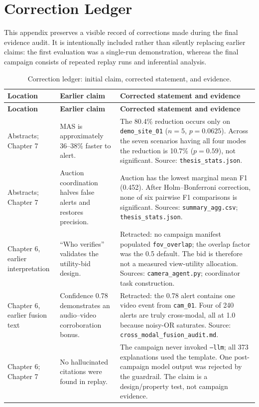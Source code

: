 \chapter{Correction Ledger}
\label{app:corrections}

This appendix preserves a visible record of corrections made during the final
evidence audit. It is intentionally included rather than silently replacing
earlier claims: the first evaluation was a single-run demonstration, whereas
the final campaign consists of repeated replay runs and inferential analysis.

\small
\begin{longtable}{p{2.7cm}p{3.4cm}p{4.7cm}}
\caption{Correction ledger: initial claim, corrected statement, and evidence.}\label{tab:correction-ledger}\\
\toprule
\textbf{Location} & \textbf{Earlier claim} & \textbf{Corrected statement and evidence} \\
\midrule
\endfirsthead
\toprule
\textbf{Location} & \textbf{Earlier claim} & \textbf{Corrected statement and evidence} \\
\midrule
\endhead
Abstracts; Chapter 7 & MAS is approximately 36--38\% faster to alert. & The 80.4\% reduction occurs only on \texttt{demo\_site\_01} ($n=5$, $p=0.0625$). Across the seven scenarios having all four modes the reduction is 10.7\% ($p=0.59$), not significant. Source: \texttt{thesis\_stats.json}. \\
Abstracts; Chapter 7 & Auction coordination halves false alerts and restores precision. & Auction has the lowest marginal mean F1 (0.452). After Holm--Bonferroni correction, none of six pairwise F1 comparisons is significant. Sources: \texttt{summary\_agg.csv}; \texttt{thesis\_stats.json}. \\
Chapter 6, earlier interpretation & ``Who verifies'' validates the utility-bid design. & Retracted: no campaign manifest populated \texttt{fov\_overlap}; the overlap factor was the 0.5 default. The bid is therefore not a measured view-utility allocation. Sources: \texttt{camera\_agent.py}; coordinator task construction. \\
Chapter 6, earlier fusion text & Confidence 0.78 demonstrates an audio--video corroboration bonus. & Retracted: the 0.78 alert contains one video event from \texttt{cam\_01}. Four of 240 alerts are truly cross-modal, all at 1.0 because noisy-OR saturates. Source: \texttt{cross\_modal\_fusion\_audit.md}. \\
Chapter 6; Chapter 7 & No hallucinated citations were found in replay. & The campaign never invoked \texttt{--llm}; all 373 explanations used the template. One post-campaign model output was rejected by the guardrail. The claim is a design/property test, not campaign evidence. \\

\end{longtable}
